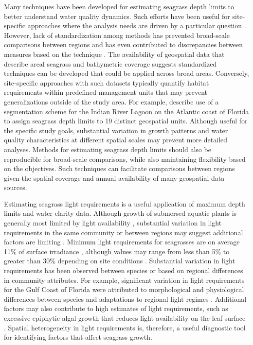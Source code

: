 \documentclass[letterpaper,12pt,oneside]{article}\usepackage[]{graphicx}\usepackage[]{color}
\begin{document}
Many techniques have been developed for estimating seagrass depth limits to better understand water quality dynamics.  Such efforts have been useful for site-specific approaches where the analysis needs are driven by a particular question \citep[e.g.,][]{Iverson86,Hale04}. However, lack of standardization among methods has prevented broad-scale comparisons between regions and has even contributed to discrepancies between measures based on the technique \citep{Spears09}.  The availability of geospatial data that describe areal seagrass and bathymetric coverage suggests standardized techniques can be developed that could be applied across broad areas.  Conversely, site-specific approaches with such datasets typically quantify habitat requirements within predefined management units that may prevent generalizations outside of the study area. For example, \cite{Steward05} describe use of a segmentation scheme for the Indian River Lagoon on the Atlantic coast of Florida to assign seagrass depth limits to 19 distinct geospatial units.  Although useful for the specific study goals, substantial variation in growth patterns and water quality characteristics at different spatial scales may prevent more detailed analyses.  Methods for estimating seagrass depth limits should also be reproducible for broad-scale comparisons, while also maintaining flexibility based on the objectives. Such techniques can facilitate comparisons between regions given the spatial coverage and annual availability of many geospatial data sources.  

Estimating seagrass light requirements is a useful application of maximum depth limits and water clarity data.  Although growth of submersed aquatic plants is generally most limited by light availability \citep{Barko82,Hall90,Dennison93}, substantial variation in light requirements in the same community or between regions may suggest additional factors are limiting \citep{Dennison93,Choice14}.  Minimum light requirements for seagrasses are on average 11\% of surface irradiance \citep{Duarte91}, although values may range from less than 5\% to greater than 30\% depending on site conditions \citep{Dennison93}. Substantial variation in light requirements has been observed between species or based on regional differences in community attributes.  For example, significant variation in light requirements for the Gulf Coast of Florida were attributed to morphological and physiological differences between species and adaptations to regional light regimes \citep{Choice14}. Additional factors may also contribute to high estimates of light requirements, such as excessive epiphytic algal growth that reduces light availability on the leaf surface \citep{Kemp04}. Spatial heterogeneity in light requirements is, therefore, a useful diagnostic tool for identifying factors that affect seagrass growth. 
\end{document}
